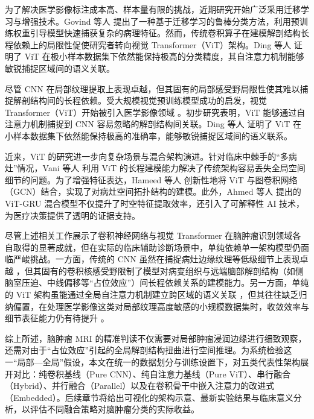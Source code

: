 为了解决医学影像标注成本高、样本量有限的挑战，近期研究开始广泛采用迁移学习与增强技术。Govind 等人 \cite{Govind2025Robust} 提出了一种基于迁移学习的鲁棒分类方法，利用预训练权重引导模型快速捕获复杂的病理特征。然而，传统卷积算子在建模解剖结构长程依赖上的局限性促使研究者转向视觉 Transformer（ViT）架构。Ding 等人 \cite{Ding2024VIT} 证明了 ViT 在极小样本数据集下依然能保持极高的分类精度，其自注意力机制能够敏锐捕捉区域间的语义关联。

尽管 CNN 在局部纹理提取上表现卓越，但其固有的局部感受野局限性使其难以捕捉解剖结构间的长程依赖。受大规模视觉预训练模型成功的启发，视觉 Transformer（ViT）开始被引入医学影像领域 \cite{Chen2021TransUNet}。初步研究表明，ViT 能够通过自注意力机制捕捉到 CNN 容易忽略的解剖结构间关联。Ding 等人 \cite{Ding2024VIT} 证明了 ViT 在小样本数据集下依然能保持极高的准确率，能够敏锐捕捉区域间的语义联系。

近来，ViT 的研究进一步向复杂场景与混合架构演进。针对临床中棘手的“多病灶”情况，Vani 等人 \cite{Vani2025Efficient} 利用 ViT 的长程建模能力解决了传统架构容易丢失全局空间细节的问题。为了增强特征表达，Hameed 等人 \cite{Hameed2025Feature} 创新性地将 ViT 与图卷积网络（GCN）结合，实现了对病灶空间拓扑结构的建模。此外，Ahmed 等人 \cite{Ahmed2024Hybrid} 提出的 ViT-GRU 混合模型不仅提升了时空特征提取效率，还引入了可解释性 AI 技术，为医疗决策提供了透明的证据支持。

尽管上述相关工作展示了卷积神经网络与视觉 Transformer 在脑肿瘤识别领域各自取得的显著成就，但在实际的临床辅助诊断场景中，单纯依赖单一架构模型仍面临严峻挑战。一方面，传统的 CNN 虽然在捕捉病灶边缘纹理等低级细节上表现卓越 \cite{Sharma2024Enhanced, Sakthi2023Deep}，但其固有的卷积核感受野限制了模型对病变组织与远端脑部解剖结构（如侧脑室压迫、中线偏移等“占位效应”）间长程依赖关系的建模能力。另一方面，单纯的 ViT 架构虽能通过全局自注意力机制建立跨区域的语义关联 \cite{Ding2024VIT}，但其往往缺乏归纳偏置，在处理医学影像这类对局部纹理高度敏感的小规模数据集时，收敛效率与细节表征能力仍有待提升 \cite{Khalighi2024AI}。

综上所述，脑肿瘤 MRI 的精准判读不仅需要对局部肿瘤浸润边缘进行细致观察，还需对由于“占位效应”引起的全局解剖结构扭曲进行空间推理。为系统检验这一“局部—全局”假设，本文在统一的数据划分与训练设置下，对五类代表性架构展开对比：纯卷积基线（Pure CNN）、纯自注意力基线（Pure ViT）、串行融合（Hybrid）、并行融合（Parallel）以及在卷积骨干中嵌入注意力的改进式（Embedded）。后续章节将给出可视化的架构示意、最新实验结果与临床意义分析，以评估不同融合策略对脑肿瘤分类的实际收益。

